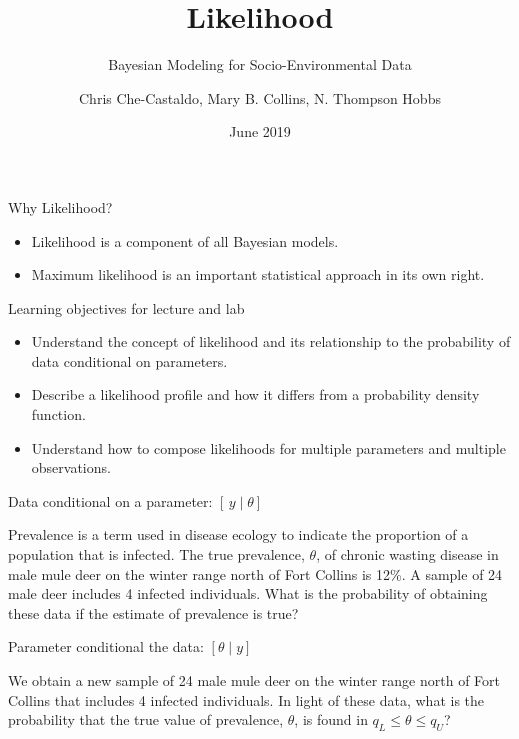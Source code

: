 \documentclass[ignorenonframetext,]{beamer}
\title{Likelihood}
\subtitle{Bayesian Modeling for Socio-Environmental Data}
\author{Chris Che-Castaldo, Mary B. Collins, N. Thompson Hobbs}
\date{June 2019}
\providecommand{\tightlist}{%
  \setlength{\itemsep}{0pt}\setlength{\parskip}{0pt}}
\begin{document}
\frame{\titlepage}

\begin{frame}{Why Likelihood?}

\begin{itemize}
\tightlist
\item
  Likelihood is a component of all Bayesian models.
\item
  Maximum likelihood is an important statistical approach in its own
  right.
\end{itemize}

\end{frame}

\begin{frame}{Learning objectives for lecture and lab}

\begin{itemize}
\tightlist
\item
  Understand the concept of likelihood and its relationship to the
  probability of data conditional on parameters.
\item
  Describe a likelihood profile and how it differs from a probability
  density function.
\item
  Understand how to compose likelihoods for multiple parameters and
  multiple observations.
\end{itemize}

\end{frame}

\begin{frame}{Data conditional on a parameter: \([\, y \mid \theta]\)}

Prevalence is a term used in disease ecology to indicate the proportion
of a population that is infected. The true prevalence, \(\theta\), of
chronic wasting disease in male mule deer on the winter range north of
Fort Collins is 12\%. A sample of 24 male deer includes 4 infected
individuals. What is the probability of obtaining these data if the
estimate of prevalence is true?

\end{frame}

\begin{frame}{Parameter conditional the data: \([\theta \mid y]\)}

We obtain a new sample of 24 male mule deer on the winter range north of
Fort Collins that includes 4 infected individuals. In light of these
data, what is the probability that the true value of prevalence,
\(\theta\), is found in \(q_{L} \le \theta \le q_{U}\)?

\end{frame}
\end{document}
